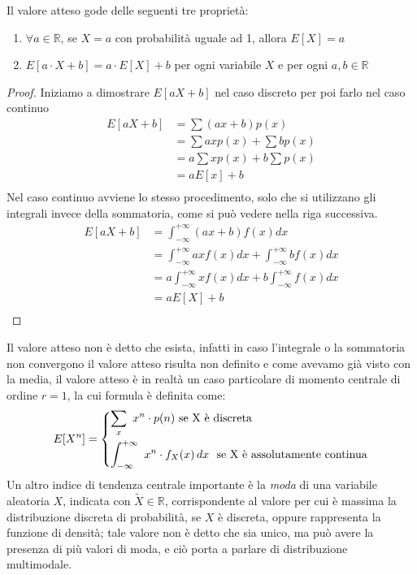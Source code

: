 \documentclass[a4paper,12pt, oneside]{book}
\newcommand{\numberset}{\mathbb}
\newcommand{\R}{\numberset{R}}
\begin{document}
Il valore atteso gode delle seguenti tre proprietà:
\begin{enumerate}
    \item $\forall a \in \R$, se $X = a$ con probabilità uguale ad 1, allora $E[X] = a$
    \item $E[a\cdot X + b] = a\cdot E[X] + b$ per ogni variabile $X$ e per ogni $a, b \in \R$
\end{enumerate}
\begin{proof}
    Iniziamo a dimostrare $E[aX + b]$ nel caso discreto per poi farlo nel caso continuo
    \[ \begin{split}
        E[aX + b] & = \sum (ax + b) p(x) \\
                  & = \sum ax p(x) + \sum b p(x)\\
                  & = a \sum x p(x) + b \sum p(x) \\
                  & = aE[x] + b\\
       \end{split} \]
    Nel caso continuo avviene lo stesso procedimento, solo che si utilizzano gli integrali invece
    della sommatoria, come si può vedere nella riga successiva.
    \[ \begin{split}
        E[aX + b] & = \int_{-\infty}^{+\infty} (ax + b) f(x) dx \\
                  & = \int_{-\infty}^{+\infty} ax f(x) dx + \int_{-\infty}^{+\infty} b f(x) dx \\
                  & = a \int_{-\infty}^{+\infty} x f(x) dx + b \int_{-\infty}^{+\infty} f(x) dx \\
                  & = aE[X] + b \\
        \end{split} \]
\end{proof}
Il valore atteso non è detto che esista, infatti in caso l'integrale o la sommatoria non convergono il valore
atteso risulta non definito e come avevamo già visto con la media, il valore atteso è in realtà un caso
particolare di momento centrale di ordine $r = 1$, la cui formula è definita come:
\[ E[X^n] = \begin{dcases}
                \sum _x \,\, x^n \cdot p(n) \,\,\mbox{se X è discreta}\\
                \int_{-\infty}^{+\infty}\,\, x^n \cdot f_X(x)\,dx \,\,\mbox{ se X è assolutamente continua}\\
            \end{dcases}\]
Un altro indice di tendenza centrale importante è la \emph{moda} di una variabile aleatoria $X$, indicata
con $\widetilde{X} \in \R$, corrispondente al valore per cui è massima la distribuzione discreta di
probabilità, se $X$ è discreta, oppure rappresenta la funzione di densità; tale valore non è detto che sia
unico, ma può avere la presenza di più valori di moda, e ciò porta a parlare di distribuzione multimodale.
\end{document}
